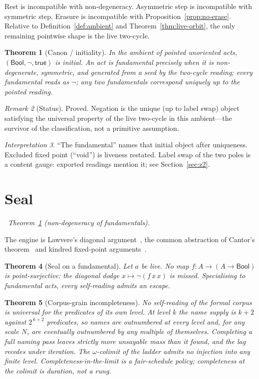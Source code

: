 \documentclass[11pt,a4paper]{article}
\theoremstyle{plain}
\newtheorem{theorem}{Theorem}[section]
\theoremstyle{definition}
\theoremstyle{remark}
\newtheorem{remark}[theorem]{Remark}
\newtheorem{interpretation}[theorem]{Interpretation}
\newcommand{\Bool}{\mathsf{Bool}}
\newcommand{\dep}[1]{%
  \par\noindent{\small\color{muted}\sffamily Dependence:}~\textit{#1}\par\medskip}
\begin{document}
Rest is incompatible with non-degeneracy. Asymmetric step is incompatible with
symmetric step. Erasure is incompatible with Proposition~\ref{prop:no-erase}.
Relative to Definition~\ref{def:ambient} and Theorem~\ref{thm:live-orbit},
the only remaining pointwise shape is the live two-cycle.

\begin{theorem}[Canon / initiality]
\label{thm:canon}
In the ambient of pointed unoriented acts, $(\Bool,\neg,\mathsf{true})$
is initial. An act is \emph{fundamental} precisely when it is
non-degenerate, symmetric, and generated from a seed by the two-cycle
reading; every fundamental reads as $\neg$; any two fundamentals
correspond uniquely up to the pointed reading.
\end{theorem}

\begin{remark}[Status]
Proved. Negation is the unique (up to label swap) object satisfying the
universal property of the live two-cycle in this ambient---the survivor
of the classification, not a primitive assumption.
\end{remark}

\begin{interpretation}
\label{int:fund}
``The fundamental'' names that initial object after uniqueness.
Excluded fixed point (``void'') is liveness restated. Label swap of the
two poles is a content gauge: exported readings mention it; see
Section~\ref{sec:z2}.
\end{interpretation}


\section{Seal}
\label{sec:seal}

\dep{Theorem~\ref{thm:canon} (non-degeneracy of fundamentals).}

The engine is Lawvere's diagonal argument~\cite{lawvere}, the common
abstraction of Cantor's theorem~\cite{cantor} and kindred fixed-point
arguments~\cite{yanofsky}.

\begin{theorem}[Seal on a fundamental]
\label{thm:seal}
Let $a$ be live. No map $f:A\to (A\to\Bool)$ is point-surjective: the
diagonal dodge $x\mapsto \neg(f\,x\,x)$ is missed. Specialising to
fundamental acts, every self-reading admits an escape.
\end{theorem}

\begin{theorem}[Corpus-grain incompleteness]
\label{thm:corpus}
No self-reading of the formal corpus is universal for the predicates of
its own level. At level $k$ the name supply is $k+2$ against $2^{\,k+2}$
predicates, so names are outnumbered at every level and, for any scale
$N$, are eventually outnumbered by any multiple of themselves.
Completing a full naming pass leaves strictly more unsayable mass than
it found, and the lag recedes under iteration. The $\omega$-colimit of
the ladder admits no injection into any finite level.
Completeness-in-the-limit is a fair-schedule \emph{policy};
completeness at the colimit is duration, not a rung.
\end{theorem}
\end{document}
